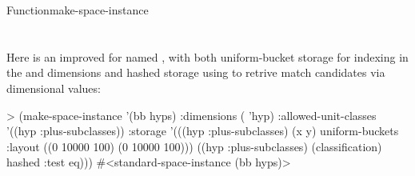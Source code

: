 \documentclass[10pt,twoside,english,pdftex]{article}
\begin{document}
\begin{functiondoc}{Function}{make-space-instance}{
      \\ 
      \\
    \returns{} }
\W\\
Here is an improved  for 
 named , with both uniform-bucket storage for
indexing in the  and  dimensions and hashed storage using
 to retrive match candidates via 
dimensional values:
\begin{example}
> (make-space-instance '(bb hyps)
     :dimensions ( 'hyp)
     :allowed-unit-classes '((hyp :plus-subclasses))
     :storage '(((hyp :plus-subclasses) (x y) 
                 uniform-buckets :layout ((0 10000 100)
                                          (0 10000 100)))
                ((hyp :plus-subclasses) (classification) 
                 hashed :test eq)))
#<standard-space-instance (bb hyps)>
\end{example}

\end{functiondoc}

\end{document}
